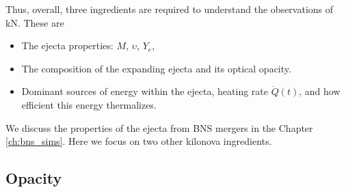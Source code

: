 Thus, overall, three ingredients are required to understand the observations of \ac{kN}. These are 
\begin{itemize}
    \item The ejecta properties: $M$, $\upsilon$, $Y_e$,
    \item The composition of the expanding ejecta and its optical opacity.
    \item Dominant sources of energy within the ejecta, heating rate $\dot{Q}(t)$, and how efficient this energy thermalizes.
\end{itemize}

We discuss the properties of the ejecta from \ac{BNS} mergers in the Chapter \ref{ch:bns_sims}.
Here we focus on two other kilonova ingredients.

\subsection{Opacity}

